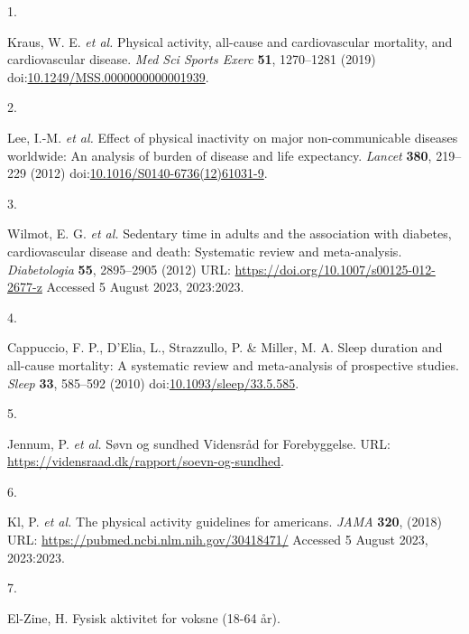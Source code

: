 \documentclass[
  10pt,
]{scrbook}
\newlength{\cslhangindent}
\newlength{\csllabelwidth}
\newlength{\cslentryspacingunit} %
\newenvironment{CSLReferences}[2] %
 {%
  \setlength{\parindent}{0pt}
  \ifodd #1
  \let\oldpar\par
  \def\par{\hangindent=\cslhangindent\oldpar}
  \fi
  \setlength{\parskip}{#2\cslentryspacingunit}
 }%
 {}
\newcommand{\CSLLeftMargin}[1]{\parbox[t]{\csllabelwidth}{#1}}
\newcommand{\CSLRightInline}[1]{\parbox[t]{\linewidth - \csllabelwidth}{#1}\break}
\let\originaltextbf\textbf
\renewcommand{\textbf}[1]{\textcolor{color1}{\originaltextbf{#1}}}
\begin{document}
\hypertarget{refs}{}
\begin{CSLReferences}{0}{0}
\leavevmode{}%
\CSLLeftMargin{1. }%
\CSLRightInline{Kraus, W. E. \emph{et al.} Physical activity, all-cause
and cardiovascular mortality, and cardiovascular disease. \emph{Med Sci
Sports Exerc} \textbf{51}, 1270--1281 (2019)
doi:\href{https://doi.org/10.1249/MSS.0000000000001939}{10.1249/MSS.0000000000001939}.}

\leavevmode{}%
\CSLLeftMargin{2. }%
\CSLRightInline{Lee, I.-M. \emph{et al.} Effect of physical inactivity
on major non-communicable diseases worldwide: An analysis of burden of
disease and life expectancy. \emph{Lancet} \textbf{380}, 219--229 (2012)
doi:\href{https://doi.org/10.1016/S0140-6736(12)61031-9}{10.1016/S0140-6736(12)61031-9}.}

\leavevmode{}%
\CSLLeftMargin{3. }%
\CSLRightInline{Wilmot, E. G. \emph{et al.} Sedentary time in adults and
the association with diabetes, cardiovascular disease and death:
Systematic review and meta-analysis. \emph{Diabetologia} \textbf{55},
2895--2905 (2012) URL: \url{https://doi.org/10.1007/s00125-012-2677-z}
Accessed 5 August 2023, 2023:2023.}

\leavevmode{}%
\CSLLeftMargin{4. }%
\CSLRightInline{Cappuccio, F. P., D'Elia, L., Strazzullo, P. \& Miller,
M. A. Sleep duration and all-cause mortality: A systematic review and
meta-analysis of prospective studies. \emph{Sleep} \textbf{33}, 585--592
(2010)
doi:\href{https://doi.org/10.1093/sleep/33.5.585}{10.1093/sleep/33.5.585}.}

\leavevmode{}%
\CSLLeftMargin{5. }%
\CSLRightInline{Jennum, P. \emph{et al.} Søvn og sundhed \textbar{}
Vidensråd for Forebyggelse. URL:
\url{https://vidensraad.dk/rapport/soevn-og-sundhed}.}

\leavevmode{}%
\CSLLeftMargin{6. }%
\CSLRightInline{Kl, P. \emph{et al.} The physical activity guidelines
for americans. \emph{{JAMA}} \textbf{320}, (2018) URL:
\url{https://pubmed.ncbi.nlm.nih.gov/30418471/} Accessed 5 August 2023,
2023:2023.}

\leavevmode{}%
\CSLLeftMargin{7. }%
\CSLRightInline{El-Zine, H. Fysisk aktivitet for voksne (18-64 år).}


\end{CSLReferences}
\end{document}

